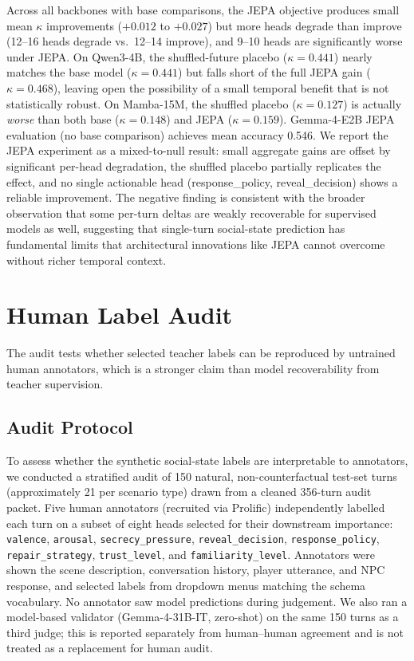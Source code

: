 \documentclass[11pt]{article}
\begin{document}
Across all backbones with base comparisons, the JEPA objective produces small mean $\kappa$ improvements ($+0.012$ to $+0.027$) but more heads degrade than improve (12--16 heads degrade vs.\ 12--14 improve), and 9--10 heads are significantly worse under JEPA.
On Qwen3-4B, the shuffled-future placebo ($\kappa{=}0.441$) nearly matches the base model ($\kappa{=}0.441$) but falls short of the full JEPA gain ($\kappa{=}0.468$), leaving open the possibility of a small temporal benefit that is not statistically robust.
On Mamba-15M, the shuffled placebo ($\kappa{=}0.127$) is actually \textit{worse} than both base ($\kappa{=}0.148$) and JEPA ($\kappa{=}0.159$).
Gemma-4-E2B JEPA evaluation (no base comparison) achieves mean accuracy 0.546.
We report the JEPA experiment as a mixed-to-null result: small aggregate gains are offset by significant per-head degradation, the shuffled placebo partially replicates the effect, and no single actionable head (response\_policy, reveal\_decision) shows a reliable improvement.
The negative finding is consistent with the broader observation that some per-turn deltas are weakly recoverable for supervised models as well, suggesting that single-turn social-state prediction has fundamental limits that architectural innovations like JEPA cannot overcome without richer temporal context.

\section{Human Label Audit}
\label{app:human_audit}

The audit tests whether selected teacher labels can be reproduced by untrained human annotators, which is a stronger claim than model recoverability from teacher supervision.

\subsection{Audit Protocol}

To assess whether the synthetic social-state labels are interpretable to annotators, we conducted a stratified audit of 150 natural, non-counterfactual test-set turns (approximately 21 per scenario type) drawn from a cleaned 356-turn audit packet.
Five human annotators (recruited via Prolific) independently labelled each turn on a subset of eight heads selected for their downstream importance:
\texttt{valence}, \texttt{arousal}, \texttt{secrecy\_pressure}, \texttt{reveal\_decision}, \texttt{response\_policy}, \texttt{repair\_strategy}, \texttt{trust\_level}, and \texttt{familiarity\_level}.
Annotators were shown the scene description, conversation history, player utterance, and NPC response, and selected labels from dropdown menus matching the schema vocabulary.
No annotator saw model predictions during judgement.
We also ran a model-based validator (Gemma-4-31B-IT, zero-shot) on the same 150 turns as a third judge; this is reported separately from human--human agreement and is not treated as a replacement for human audit.
\end{document}
